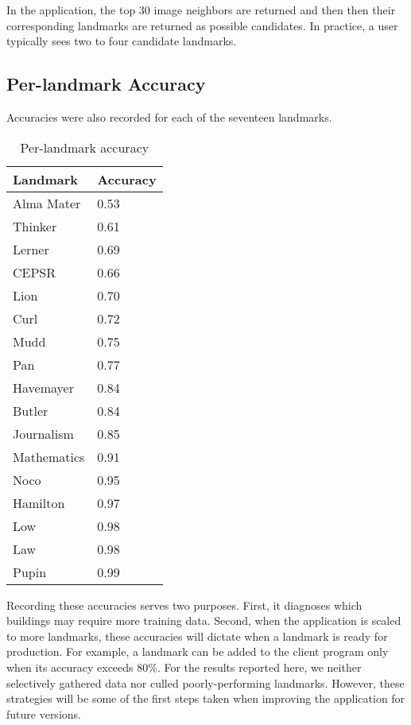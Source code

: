 In the application, the top 30 image neighbors are returned and then then their corresponding landmarks are returned as possible candidates. In practice, a user typically sees two to four candidate landmarks.

\subsection{Per-landmark Accuracy}

Accuracies were also recorded for each of the seventeen landmarks.

\begin{table}[ht!]
\label{tab:results}
\centering
\begin{tabular}{| l | l |}
\hline
Landmark & Accuracy \\ \hline
Alma Mater	   &	0.53 \\ 
Thinker      &    0.61 \\ 
Lerner        &    0.69 \\ 
CEPSR          &    0.66 \\ 
Lion         &    0.70 \\ 
Curl           &    0.72 \\ 
Mudd           &    0.75 \\ 
Pan           &    0.77 \\ 
Havemayer      &    0.84 \\ 
Butler         &    0.84 \\ 
Journalism     &    0.85 \\ 
Mathematics    &    0.91 \\ 
Noco           &    0.95 \\ 
Hamilton       &    0.97 \\ 
Low            &    0.98 \\ 
Law            &    0.98 \\ 
Pupin          &    0.99 \\ \hline
\end{tabular}
\vspace*{10pt}
\caption{Per-landmark accuracy}
\end{table}

Recording these accuracies serves two purposes. First, it diagnoses which buildings may require more training data. Second, when the application is scaled to more landmarks, these accuracies will dictate when a landmark is ready for production. For example, a landmark can be added to the client program only when its accuracy exceeds 80\%. For the results reported here, we neither selectively gathered data nor culled poorly-performing landmarks. However, these strategies will be some of the first steps taken when improving the application for future versions.  
